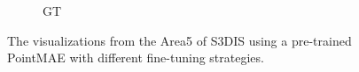 \begin{figure}
\begin{subfigure}{0.235\textwidth}
        \caption{GT}
        \label{fig:s3dis6}
    \end{subfigure}
    \caption{The visualizations from the Area5 of S3DIS using a pre-trained PointMAE with different fine-tuning strategies.}
    \label{fig:s3dis}
\end{figure}